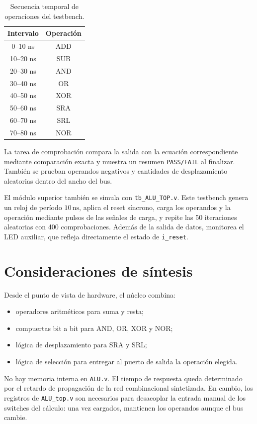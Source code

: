 \documentclass[11pt,a4paper]{article}
\newcommand{\verilog}[1]{\texttt{#1}}
\begin{document}
\begin{table}[ht]
\centering
\caption{Secuencia temporal de operaciones del testbench.}
\label{tab:timing}
\begin{tabular}{c c}
\toprule
\textbf{Intervalo} & \textbf{Operación}\\
\midrule
0--10 ns   & ADD\\
10--20 ns  & SUB\\
20--30 ns  & AND\\
30--40 ns  & OR\\
40--50 ns  & XOR\\
50--60 ns  & SRA\\
60--70 ns  & SRL\\
70--80 ns  & NOR\\
\bottomrule
\end{tabular}
\end{table}

La tarea de comprobación compara la salida con la ecuación correspondiente
mediante comparación exacta y muestra un resumen \verilog{PASS/FAIL} al
finalizar. También se prueban operandos negativos y cantidades de
desplazamiento aleatorias dentro del ancho del bus.

El módulo superior también se simula con \verilog{tb\_ALU\_TOP.v}. Este
testbench genera un reloj de período $10\,\mathrm{ns}$, aplica el reset síncrono,
carga los operandos y la operación mediante pulsos de las señales de carga, y
repite las 50 iteraciones aleatorias con 400 comprobaciones. Además de la
salida de datos, monitorea el LED auxiliar, que refleja directamente el estado
de \verilog{i\_reset}.

\section{Consideraciones de síntesis}

Desde el punto de vista de hardware, el núcleo combina:

\begin{itemize}
  \item operadores aritméticos para suma y resta;
  \item compuertas bit a bit para AND, OR, XOR y NOR;
  \item lógica de desplazamiento para SRA y SRL;
  \item lógica de selección para entregar al puerto de salida la operación
        elegida.
\end{itemize}

No hay memoria interna en \verilog{ALU.v}. El tiempo de respuesta queda
determinado por el retardo de propagación de la red combinacional sintetizada.
En cambio, los registros de \verilog{ALU\_top.v} son necesarios para desacoplar
la entrada manual de los switches del cálculo: una vez cargados, mantienen los
operandos aunque el bus cambie.
\end{document}
